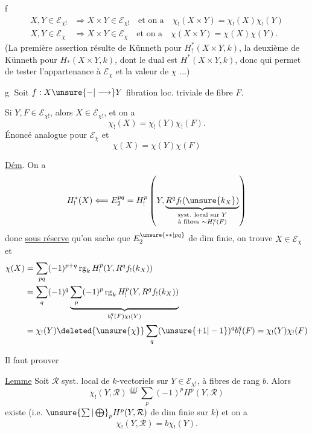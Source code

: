 
\textcircled{f}
\[
\begin{aligned}
X,Y\in\mathcal{E}_{\chi!}&\Longrightarrow X\times Y\in\mathcal{E}_{\chi!}\quad\text{et on a}\quad\chi_!(X\times Y)=\chi_!(X)\chi_!(Y)\\
X,Y\in\mathcal{E}_{\chi}&\Longrightarrow X\times Y\in\mathcal{E}_{\chi}\quad\text{et on a}\quad\chi(X\times Y)=\chi(X)\chi(Y).
\end{aligned}
\]
(La première assertion résulte de Künneth pour $H^*_!(X\times Y,k)$, la deuxième de Künneth pour $H_*(X\times Y,k)$, dont le dual est $H^*(X\times Y,k)$, donc qui permet de tester l'appartenance à $\mathcal{E}_{\chi}$ et la valeur de $\chi$ ...)

\textcircled{g} Soit $f:X\unsure{-|\longrightarrow}Y$ fibration loc. triviale de fibre $F$.

Si $Y,F\in\mathcal{E}_{\chi!}$, alors $X\in\mathcal{E}_{\chi!}$, et on a
\[
\chi_!(X)=\chi_!(Y)\chi_!(F).
\]
Énoncé analogue pour $\mathcal{E}_{\chi}$ et 
\[
\chi(X)=\chi(Y)\chi(F)
\]

\uline{Dém}. On a
\[
H^*_!(X)\Longleftarrow E_2^{pq}=H^p_!\left(Y,\underbrace{R^q f_!(\unsure{k_X})}_{\substack{\text{syst. local sur }Y\\\text{à fibres }\sim H^q_!(F)}}\right)
\]
donc \uline{sous réserve} qu'on sache que $E_2^{\unsure{**|pq}}$ de dim finie, on trouve $X\in\mathcal{E}_{\chi}$ et
\[
\begin{aligned}
\chi(X)&=\sum_{pq}(-1)^{p+q}\operatorname{rg}_k H^p_!(Y,R^q f_!(k_X))\\
&=\sum_q(-1)^q\underbrace{\sum_p(-1)^p\operatorname{rg}_k H^p_!(Y,R^q f_!(k_X))}_{b^q_!(F)\chi_!(Y)}\\
&=\chi_!(Y)\deleted{\unsure{\chi}}\sum_q(\unsure{+1|-1})^q b^q_!(F)=\chi_!(Y)\chi_!(F)
\end{aligned}
\]

Il faut prouver

\uline{Lemme} Soit $\mathcal{R}$ syst. local de $k$-vectoriels sur  $Y\in\mathcal{E}_{\chi!}$, à fibres de rang  $b$. Alors
\[
\chi_!(Y,\mathcal{R})\overset{\mathrm{déf}}=\sum_p(-1)^p H^p(Y,\mathcal{R})
\]
existe (i.e. $\unsure{\sum|\bigoplus}_p H^p(Y,\mathcal{R})$ de dim finie sur $k$) et on a
\[
\chi_!(Y,\mathcal{R})=b\chi_!(Y).
\]


